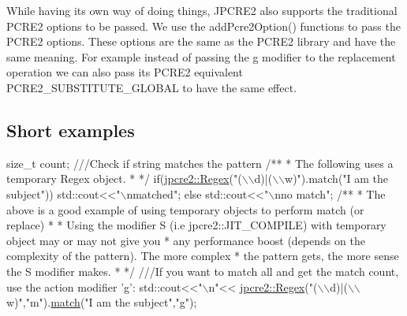 While having its own way of doing things, J\+P\+C\+R\+E2 also supports the traditional P\+C\+R\+E2 options to be passed. We use the {\ttfamily add\+Pcre2\+Option()} functions to pass the P\+C\+R\+E2 options. These options are the same as the P\+C\+R\+E2 library and have the same meaning. For example instead of passing the \textquotesingle{}g\textquotesingle{} modifier to the replacement operation we can also pass its P\+C\+R\+E2 equivalent {\ttfamily P\+C\+R\+E2\+\_\+\+S\+U\+B\+S\+T\+I\+T\+U\+T\+E\+\_\+\+G\+L\+O\+B\+AL} to have the same effect.\hypertarget{index_short-examples}{}\subsection{Short examples}\label{index_short-examples}

\begin{DoxyCode}
\textcolor{keywordtype}{size\_t} count;\textcolor{comment}{}
\textcolor{comment}{///Check if string matches the pattern}
\textcolor{comment}{}\textcolor{comment}{/**}
\textcolor{comment}{ * The following uses a temporary Regex object.}
\textcolor{comment}{ * */}
\textcolor{keywordflow}{if}(\hyperlink{classjpcre2_1_1Regex}{jpcre2::Regex}(\textcolor{stringliteral}{"(\(\backslash\)\(\backslash\)d)|(\(\backslash\)\(\backslash\)w)"}).match(\textcolor{stringliteral}{"I am the subject"})) 
    std::cout<<\textcolor{stringliteral}{"\(\backslash\)nmatched"};
\textcolor{keywordflow}{else}
    std::cout<<\textcolor{stringliteral}{"\(\backslash\)nno match"};\textcolor{comment}{}
\textcolor{comment}{/**}
\textcolor{comment}{ * The above is a good example of using temporary objects to perform match (or replace)}
\textcolor{comment}{ * }
\textcolor{comment}{ * Using the modifier S (i.e jpcre2::JIT\_COMPILE) with temporary object may or may not give you}
\textcolor{comment}{ * any performance boost (depends on the complexity of the pattern). The more complex }
\textcolor{comment}{ * the pattern gets, the more sense the S modifier makes.}
\textcolor{comment}{ * */}
\textcolor{comment}{}
\textcolor{comment}{///If you want to match all and get the match count, use the action modifier 'g':}
\textcolor{comment}{}std::cout<<\textcolor{stringliteral}{"\(\backslash\)n"}<<
    \hyperlink{classjpcre2_1_1Regex}{jpcre2::Regex}(\textcolor{stringliteral}{"(\(\backslash\)\(\backslash\)d)|(\(\backslash\)\(\backslash\)w)"},\textcolor{stringliteral}{"m"}).\hyperlink{classjpcre2_1_1Regex_ab93775a93a0a537d09b9e9ab4a5a3894}{match}(\textcolor{stringliteral}{"I am the subject"},\textcolor{stringliteral}{"g"});

\end{DoxyCode}
